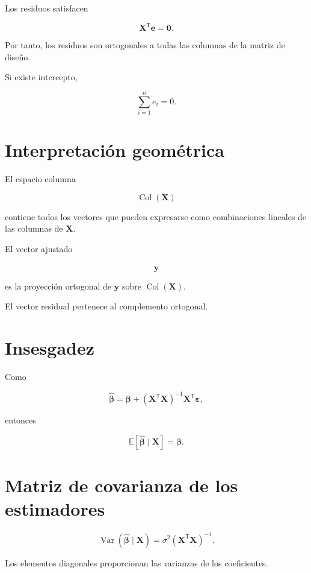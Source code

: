 \documentclass[
  spanish,
  11pt,
  letterpaper,
  DIV=11,
  numbers=noendperiod]{scrreprt}
\theoremstyle{definition}
\theoremstyle{plain}
\theoremstyle{definition}
\theoremstyle{remark}
\begin{document}
Los residuos satisfacen

\[
\mathbf{X}^{\mathsf T}\mathbf{e}
=
\mathbf{0}.
\]

Por tanto, los residuos son ortogonales a todas las columnas de la
matriz de diseño.

Si existe intercepto,

\[
\sum_{i=1}^{n}e_i=0.
\]

\section{Interpretación
geométrica}\label{interpretaciuxf3n-geomuxe9trica-2}

El espacio columna

\[
\operatorname{Col}(\mathbf{X})
\]

contiene todos los vectores que pueden expresarse como combinaciones
lineales de las columnas de \(\mathbf{X}\).

El vector ajustado

\[
\widehat{\mathbf{y}}
\]

es la proyección ortogonal de \(\mathbf{y}\) sobre
\(\operatorname{Col}(\mathbf{X})\).

El vector residual pertenece al complemento ortogonal.

\section{Insesgadez}\label{insesgadez}

Como

\[
\widehat{\boldsymbol{\beta}}
=
\boldsymbol{\beta}
+
\left(
\mathbf{X}^{\mathsf T}\mathbf{X}
\right)^{-1}
\mathbf{X}^{\mathsf T}\boldsymbol{\varepsilon},
\]

entonces

\[
\mathbb{E}
\left[
\widehat{\boldsymbol{\beta}}
\mid\mathbf{X}
\right]
=
\boldsymbol{\beta}.
\]

\section{Matriz de covarianza de los
estimadores}\label{matriz-de-covarianza-de-los-estimadores}

\[
\operatorname{Var}
\left(
\widehat{\boldsymbol{\beta}}
\mid\mathbf{X}
\right)
=
\sigma^2
\left(
\mathbf{X}^{\mathsf T}\mathbf{X}
\right)^{-1}.
\]

Los elementos diagonales proporcionan las varianzas de los coeficientes.
\end{document}
